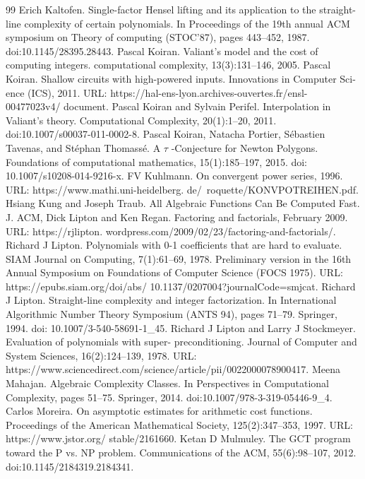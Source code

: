 \documentclass[10pt,a4paper]{article}
\begin{document}
\begin{thebibliography}{99}
 Erich Kaltofen. Single-factor Hensel lifting and its application to the straight-line complexity of certain polynomials. In Proceedings of the 19th annual ACM symposium on Theory of computing (STOC’87), pages 443–452, 1987. doi:10.1145/28395.28443.
 Pascal Koiran. Valiant’s model and the cost of computing integers. computational complexity, 13(3):131–146, 2005.
 Pascal Koiran. Shallow circuits with high-powered inputs. Innovations in Computer Sci- ence (ICS), 2011. URL: https://hal-ens-lyon.archives-ouvertes.fr/ensl-00477023v4/ document.
 Pascal Koiran and Sylvain Perifel. Interpolation in Valiant’s theory. Computational Complexity, 20(1):1–20, 2011. doi:10.1007/s00037-011-0002-8.
 Pascal Koiran, Natacha Portier, Sébastien Tavenas, and Stéphan Thomassé. A $\tau$ -Conjecture for Newton Polygons. Foundations of computational mathematics, 15(1):185–197, 2015. doi: 10.1007/s10208-014-9216-x.
 FV Kuhlmann. On convergent power series, 1996. URL: https://www.mathi.uni-heidelberg. de/~roquette/KONVPOTREIHEN.pdf.
 Hsiang Kung and Joseph Traub. All Algebraic Functions Can Be Computed Fast. J. ACM,
 Dick Lipton and Ken Regan. Factoring and factorials, February 2009. URL: https://rjlipton. wordpress.com/2009/02/23/factoring-and-factorials/.
 Richard J Lipton. Polynomials with 0-1 coefficients that are hard to evaluate. SIAM Journal on Computing, 7(1):61–69, 1978. Preliminary version in the 16th Annual Symposium on Foundations of Computer Science (FOCS 1975). URL: https://epubs.siam.org/doi/abs/ 10.1137/0207004?journalCode=smjcat.
 Richard J Lipton. Straight-line complexity and integer factorization. In International Algorithmic Number Theory Symposium (ANTS 94), pages 71–79. Springer, 1994. doi: 10.1007/3-540-58691-1\_45.
 Richard J Lipton and Larry J Stockmeyer. Evaluation of polynomials with super- preconditioning. Journal of Computer and System Sciences, 16(2):124–139, 1978. URL: https://www.sciencedirect.com/science/article/pii/0022000078900417.
 Meena Mahajan. Algebraic Complexity Classes. In Perspectives in Computational Complexity, pages 51–75. Springer, 2014. doi:10.1007/978-3-319-05446-9\_4.
 Carlos Moreira. On asymptotic estimates for arithmetic cost functions. Proceedings of the American Mathematical Society, 125(2):347–353, 1997. URL: https://www.jstor.org/ stable/2161660.
 Ketan D Mulmuley. The GCT program toward the P vs. NP problem. Communications of the ACM, 55(6):98–107, 2012. doi:10.1145/2184319.2184341.

\end{thebibliography}
\end{document}
